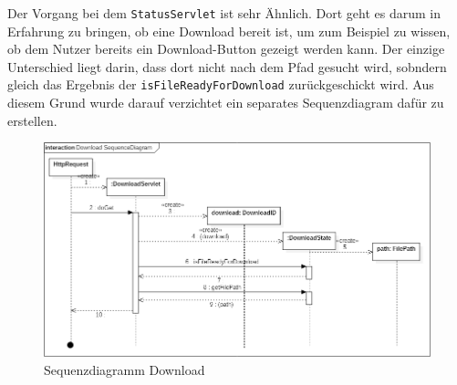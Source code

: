 Der Vorgang bei dem \texttt{StatusServlet} ist sehr Ähnlich. Dort geht es darum in Erfahrung zu bringen, ob eine Download bereit ist, um zum Beispiel zu wissen, ob dem Nutzer bereits ein Download-Button gezeigt werden kann. Der einzige Unterschied liegt darin, dass dort nicht nach dem Pfad gesucht wird, sobndern gleich das Ergebnis der \texttt{isFileReadyForDownload} zurückgeschickt wird. Aus diesem Grund wurde darauf verzichtet ein separates Sequenzdiagram dafür zu erstellen.
\begin{figure}[!hbp]
	\centering
	\includegraphics[width=\linewidth]{images/export/DownloadSequenceDiagram.png}
	\caption{Sequenzdiagramm Download}
\end{figure}
